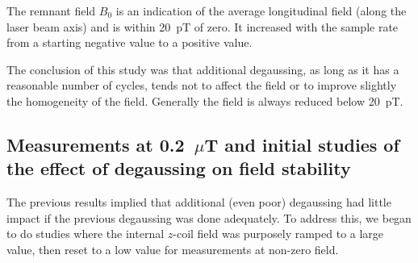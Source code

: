 The remnant field $B_0$ is an indication of the average longitudinal
field (along the laser beam axis) and is within 20~pT of zero.  It
increased with the sample rate from a starting negative value to a
positive value.

The conclusion of this study was that additional degaussing, as long
as it has a reasonable number of cycles, tends not to affect the field
or to improve slightly the homogeneity of the field.  Generally the
field is always reduced below 20~pT.



\subsection{Measurements at 0.2~$\mu$T and initial studies of the effect of degaussing on field stability\label{sec:three-degauss}}

The previous results implied that additional (even poor) degaussing
had little impact if the previous degaussing was done adequately.  To
address this, we began to do studies where the internal $z$-coil field
was purposely ramped to a large value, then reset to a low value for
measurements at non-zero field.


